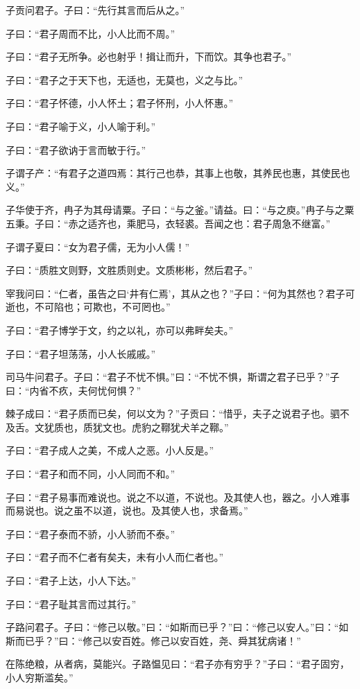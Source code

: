 \documentclass[a5paper]{ctexbook}
\begin{document}
    子贡问君子。子曰：“先行其言而后从之。”
    
    子曰：“君子周而不比，小人比而不周。”

    子曰：“君子无所争。必也射乎！揖让而升，下而饮。其争也君子。”

    子曰：“君子之于天下也，无适也，无莫也，义之与比。”

    子曰：“君子怀德，小人怀土；君子怀刑，小人怀惠。”

    子曰：“君子喻于义，小人喻于利。”

    子曰：“君子欲讷于言而敏于行。”

    子谓子产：“有君子之道四焉：其行己也恭，其事上也敬，其养民也惠，其使民也义。”

    子华使于齐，冉子为其母请粟。子曰：“与之釜。”请益。曰：“与之庾。”冉子与之粟五秉。子曰：“赤之适齐也，乘肥马，衣轻裘。吾闻之也：君子周急不继富。”

    子谓子夏曰：“女为君子儒，无为小人儒！”

    子曰：“质胜文则野，文胜质则史。文质彬彬，然后君子。”

    宰我问曰：“仁者，虽告之曰‘井有仁焉’，其从之也？”子曰：“何为其然也？君子可逝也，不可陷也；可欺也，不可罔也。”

    子曰：“君子博学于文，约之以礼，亦可以弗畔矣夫。”

    子曰：“君子坦荡荡，小人长戚戚。”

    司马牛问君子。子曰：“君子不忧不惧。”曰：“不忧不惧，斯谓之君子已乎？”子曰：“内省不疚，夫何忧何惧？”

    棘子成曰：“君子质而已矣，何以文为？”子贡曰：“惜乎，夫子之说君子也。驷不及舌。文犹质也，质犹文也。虎豹之鞹犹犬羊之鞹。”

    子曰：“君子成人之美，不成人之恶。小人反是。”

    子曰：“君子和而不同，小人同而不和。”

    子曰：“君子易事而难说也。说之不以道，不说也。及其使人也，器之。小人难事而易说也。说之虽不以道，说也。及其使人也，求备焉。”

    子曰：“君子泰而不骄，小人骄而不泰。”

    子曰：“君子而不仁者有矣夫，未有小人而仁者也。”

    子曰：“君子上达，小人下达。”

    子曰：“君子耻其言而过其行。”

    子路问君子。子曰：“修己以敬。”曰：“如斯而已乎？”曰：“修己以安人。”曰：“如斯而已乎？”曰：“修己以安百姓。修己以安百姓，尧、舜其犹病诸！”

    在陈绝粮，从者病，莫能兴。子路愠见曰：“君子亦有穷乎？”子曰：“君子固穷，小人穷斯滥矣。”
\end{document}

